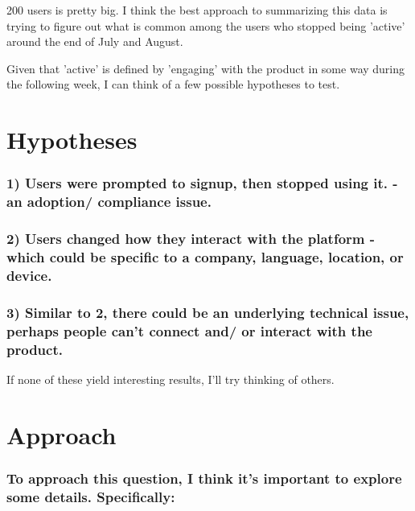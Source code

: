\documentclass{report}
\begin{document}
200 users is pretty big. I think the best approach to summarizing this
data is trying to figure out what is common among the users who stopped
being 'active' around the end of July and August.

Given that 'active' is defined by 'engaging' with the product in some
way during the following week, I can think of a few possible hypotheses
to test.

\chapter{Hypotheses}\label{hypotheses}

\subsection{1) Users were prompted to signup, then stopped using it. -
an adoption/ compliance
issue.}\label{users-were-prompted-to-signup-then-stopped-using-it.---an-adoption-compliance-issue.}

\subsection{2) Users changed how they interact with the platform - which
could be specific to a company, language, location, or
device.}\label{users-changed-how-they-interact-with-the-platform---which-could-be-specific-to-a-company-language-location-or-device.}

\subsection{3) Similar to 2, there could be an underlying technical
issue, perhaps people can't connect and/ or interact with the
product.}\label{similar-to-2-there-could-be-an-underlying-technical-issue-perhaps-people-cant-connect-and-or-interact-with-the-product.}

If none of these yield interesting results, I'll try thinking of others.

\chapter{Approach}\label{approach}

\subsection{To approach this question, I think it's important to explore
some details.
Specifically:}\label{to-approach-this-question-i-think-its-important-to-explore-some-details.-specifically}
\end{document}
